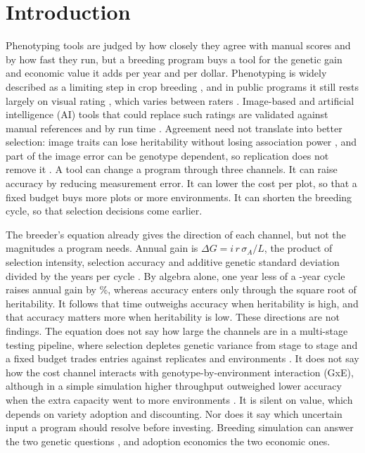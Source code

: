 \section{Introduction}\label{sec:intro}

Phenotyping tools are judged by how closely they agree with manual scores and by how fast they run, but a breeding program buys a tool for the genetic gain and economic value it adds per year and per dollar. Phenotyping is widely described as a limiting step in crop breeding \citep{Song2021Highthroughput,Fasoula2020Phenotyping,Kholova2021Pursuit}, and in public programs it still rests largely on visual rating \citep{Walter2015Plant}, which varies between raters \citep{Bock2021Plant,Lasdun2024Participatory}. Image-based and artificial intelligence (AI) tools that could replace such ratings are validated against manual references and by run time \citep{Mochida2018Computer,Liu2021Pocketmaize,McDonald2022Automated,Hu2025Openpheno}. Agreement need not translate into better selection: image traits can lose heritability without losing association power \citep{Gage2018Comparing}, and part of the image error can be genotype dependent, so replication does not remove it \citep{Zhou2021Identification}. A tool can change a program through three channels. It can raise accuracy by reducing measurement error. It can lower the cost per plot, so that a fixed budget buys more plots or more environments. It can shorten the breeding cycle, so that selection decisions come earlier.

The breeder's equation already gives the direction of each channel, but not the magnitudes a program needs. Annual gain is $\Delta G = i\, r\, \sigma_A / L$, the product of selection intensity, selection accuracy and additive genetic standard deviation divided by the years per cycle \citep{Cobb2019Enhancing,Hickey2017Genomic}. By algebra alone, one year less of a \NumCfgCycleYears-year cycle raises annual gain by \NumCycOneYearPct\%, whereas accuracy enters only through the square root of heritability. It follows that time outweighs accuracy when heritability is high, and that accuracy matters more when heritability is low. These directions are not findings. The equation does not say how large the channels are in a multi-stage testing pipeline, where selection depletes genetic variance from stage to stage and a fixed budget trades entries against replicates and environments \citep{Lorenz2013Resource,Gorjanc2018Optimal}. It does not say how the cost channel interacts with genotype-by-environment interaction (GxE), although in a simple simulation higher throughput outweighed lower accuracy when the extra capacity went to more environments \citep{Lane2021High}. It is silent on value, which depends on variety adoption and discounting. Nor does it say which uncertain input a program should resolve before investing. Breeding simulation can answer the two genetic questions \citep{Gaynor2020Alphasimr,Peixoto2023Simulationbased,Jahufer2021Deterministic}, and adoption economics the two economic ones.

